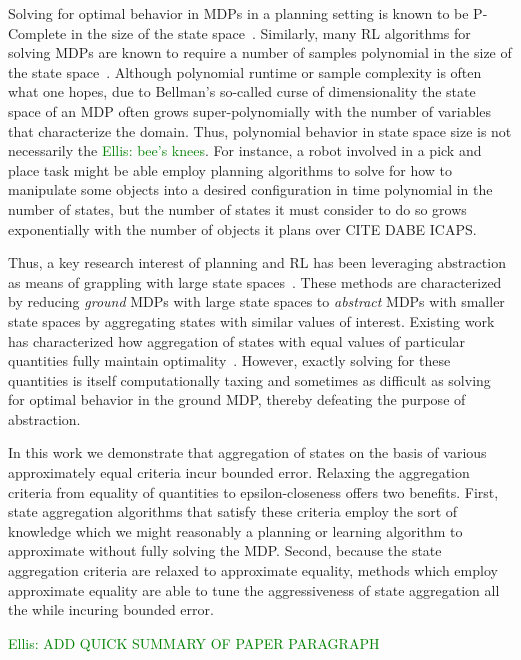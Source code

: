 \documentclass{article}
\newcommand\enote[1]{\textcolor{green}{Ellis: #1}}
\begin{document}
Solving for optimal behavior in \acp{MDP} in a planning setting is known to be P-Complete in the size of the state space~\cite{littman1995complexity,papadimitriou1987complexity}. Similarly, many \ac{RL} algorithms for solving MDPs are known to require a number of samples polynomial in the size of the state space~\cite{strehl2009reinforcement}. Although polynomial runtime or sample complexity is often what one hopes, due to Bellman's so-called curse of dimensionality the state space of an MDP often grows super-polynomially with the number of variables that characterize the domain. Thus, polynomial behavior in state space size is not necessarily the \enote{bee's knees}. For instance, a robot involved in a pick and place task might be able employ planning algorithms to solve for how to manipulate some objects into a desired configuration in time polynomial in the number of states, but the number of states it must consider to do so grows exponentially with the number of objects it plans over CITE DABE ICAPS.

Thus, a key research interest of planning and RL has been leveraging abstraction as means of grappling with large state spaces~\cite{andre2002state,jong2005state,dietterich2000hierarchical,Bean2011}. These methods are characterized by reducing \textit{ground} MDPs with large state spaces to \textit{abstract} MDPs with smaller state spaces by aggregating states with similar values of interest. Existing work has characterized how aggregation of states with equal values of particular quantities fully maintain optimality~\cite{li2006towards,dean1997modelmin}. However, exactly solving for these quantities is itself computationally taxing and sometimes as difficult as solving for optimal behavior in the ground MDP, thereby defeating the purpose of abstraction.

In this work we demonstrate that aggregation of states on the basis of various approximately equal criteria incur bounded error.  Relaxing the aggregation criteria from equality of quantities to epsilon-closeness offers two benefits. First, state aggregation algorithms that satisfy these criteria employ the sort of knowledge which we might reasonably a planning or learning algorithm to approximate without fully solving the MDP. Second, because the state aggregation criteria are relaxed to approximate equality, methods which employ approximate equality are able to tune the aggressiveness of state aggregation all the while incuring bounded error.
	
\enote{ADD QUICK SUMMARY OF PAPER PARAGRAPH}
\end{document}
